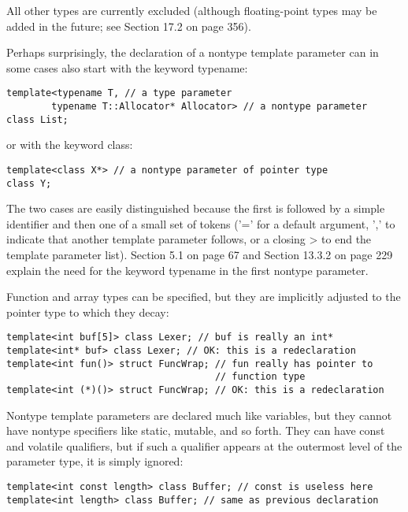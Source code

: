 All other types are currently excluded (although floating-point types may be added in the future; see Section 17.2 on page 356).

Perhaps surprisingly, the declaration of a nontype template parameter can in some cases also start with the keyword typename:

\begin{lstlisting}[style=styleCXX]
template<typename T, // a type parameter
		typename T::Allocator* Allocator> // a nontype parameter
class List;
\end{lstlisting}

or with the keyword class:

\begin{lstlisting}[style=styleCXX]
template<class X*> // a nontype parameter of pointer type
class Y;
\end{lstlisting}

The two cases are easily distinguished because the first is followed by a simple identifier and then one of a small set of tokens (’=’ for a default argument, ’,’ to indicate that another template parameter follows, or a closing > to end the template parameter list). Section 5.1 on page 67 and Section 13.3.2 on page 229 explain the need for the keyword typename in the first nontype parameter.

Function and array types can be specified, but they are  implicitly adjusted to the pointer type to which they decay:

\begin{lstlisting}[style=styleCXX]
template<int buf[5]> class Lexer; // buf is really an int*
template<int* buf> class Lexer; // OK: this is a redeclaration
template<int fun()> struct FuncWrap; // fun really has pointer to
								     // function type
template<int (*)()> struct FuncWrap; // OK: this is a redeclaration
\end{lstlisting}

Nontype template parameters are declared much like variables, but they cannot have nontype specifiers like static, mutable, and so forth. They can have const and volatile qualifiers, but if such a qualifier appears at the outermost level of the parameter type, it is simply ignored:

\begin{lstlisting}[style=styleCXX]
template<int const length> class Buffer; // const is useless here
template<int length> class Buffer; // same as previous declaration
\end{lstlisting}


